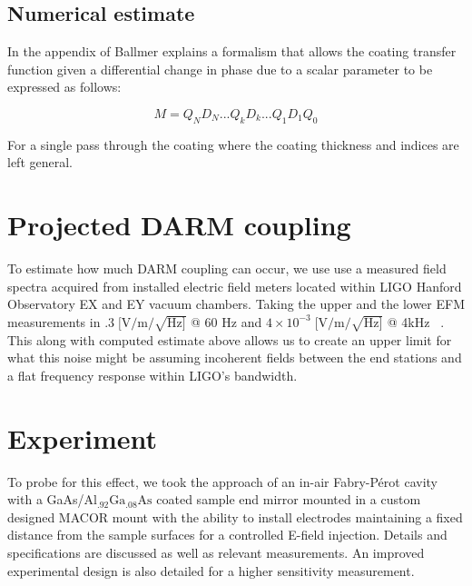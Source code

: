\subsection{Numerical estimate}

In the appendix of \cite{ballmer2015} Ballmer explains a formalism that allows the coating transfer function given a differential change in phase due to a scalar parameter to be expressed as follows:

\begin{equation}
M = Q_N D_N ...Q_kD_k...Q_1D_1Q_0
\end{equation}

For a single pass through the coating where the coating thickness and indices are left general.


\section{Projected DARM coupling}
To estimate how much DARM coupling can occur, we use use a measured field spectra acquired from installed electric field meters located within LIGO Hanford Observatory EX and EY vacuum chambers. Taking the upper and the lower EFM measurements in $.3\; [\mathrm{V}/\mathrm{m}/\sqrt{\mathrm{Hz}]}$ @ 60 Hz and $4\times10^{-3}\; [\mathrm{V}/\mathrm{m}/\sqrt{\mathrm{Hz}]}$ @ 4kHz ~\cite{efm_log}.
This along with computed estimate above allows us to create an upper limit for what this noise might be assuming incoherent fields between the end stations and a flat frequency response within LIGO's bandwidth.

\section{Experiment}
To probe for this effect, we took the approach of an in-air Fabry-P\'{e}rot cavity with a GaAs/$\mathrm{Al_{.92}Ga_{.08}As}$ coated sample end mirror mounted in a custom designed MACOR mount with the ability to install electrodes maintaining a fixed distance from the sample surfaces for a controlled E-field injection. Details and specifications are discussed as well as relevant measurements. An improved experimental design is also detailed for a higher sensitivity measurement.

